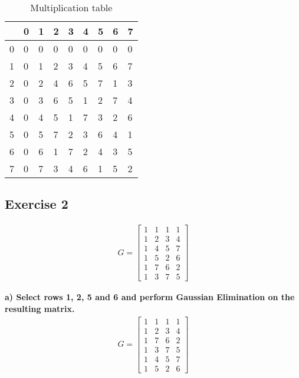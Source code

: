 \begin{table}[H]
    \begin{tabularx}{\textwidth}{| Y | Y | Y | Y | Y | Y | Y | Y | Y |}
        \hline
         & 0 & 1 & 2 & 3 & 4 & 5 & 6 & 7 \\\hline
        0 & 0 & 0 & 0 & 0 & 0 & 0 & 0 & 0 \\\hline
        1 & 0 & 1 & 2 & 3 & 4 & 5 & 6 & 7 \\\hline
        2 & 0 & 2 & 4 & 6 & 5 & 7 & 1 & 3 \\\hline
        3 & 0 & 3 & 6 & 5 & 1 & 2 & 7 & 4 \\\hline
        4 & 0 & 4 & 5 & 1 & 7 & 3 & 2 & 6 \\\hline
        5 & 0 & 5 & 7 & 2 & 3 & 6 & 4 & 1 \\\hline
        6 & 0 & 6 & 1 & 7 & 2 & 4 & 3 & 5 \\\hline
        7 & 0 & 7 & 3 & 4 & 6 & 1 & 5 & 2 \\\hline
    \end{tabularx}
    \caption{Multiplication table}
    \label{tab:ff21b}
\end{table}

\subsection{Exercise 2}
\begin{align}
    G = 
    \begin{bmatrix}
        1 & 1 & 1 & 1 \\
        1 & 2 & 3 & 4 \\
        1 & 4 & 5 & 7 \\
        1 & 5 & 2 & 6 \\
        1 & 7 & 6 & 2 \\
        1 & 3 & 7 & 5
    \end{bmatrix}
\end{align}

\noindent\textbf{a) Select rows 1, 2, 5 and 6 and perform Gaussian Elimination on the resulting matrix.}\\
\begin{align}
    G = 
    \begin{bmatrix}
        1 & 1 & 1 & 1 \\
        1 & 2 & 3 & 4 \\
        1 & 7 & 6 & 2 \\
        1 & 3 & 7 & 5 \\
        1 & 4 & 5 & 7 \\
        1 & 5 & 2 & 6         
    \end{bmatrix}
\end{align}

